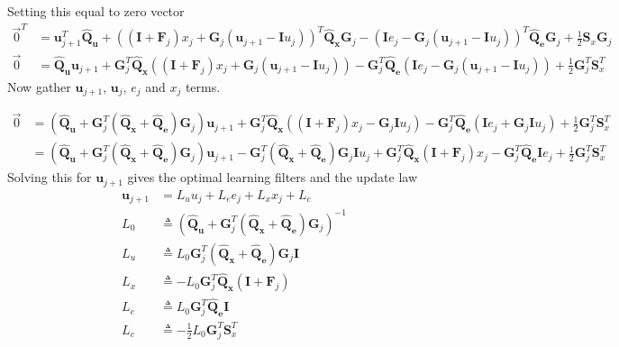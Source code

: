 \documentclass{article}
\begin{document}
Setting this equal to zero vector
\begin{align}
\vec{0}^T &
= \mathbf{u}_{j+1}^T \mathbf{\hat{Q}_u} 
+ \left( \left(\mathbf{I} +\mathbf{F}_j \right)x_j + \mathbf{G}_j \left(\mathbf{u}_{j+1} - \mathbf{I}u_j \right) \right)^T \mathbf{\hat{Q}_x}\mathbf{G}_j
- \left( \mathbf{I} e_j - \mathbf{G}_j \left(\mathbf{u}_{j+1} - \mathbf{I}u_j \right)\right)^T \mathbf{\hat{Q}_e} \mathbf{G}_j
+ \frac{1}{2}\mathbf{S}_x  \mathbf{G}_j\\
\vec{0} &
= \mathbf{\hat{Q}_u} \mathbf{u}_{j+1}
+ \mathbf{G}_j ^T \mathbf{\hat{Q}_x}\left( \left(\mathbf{I} +\mathbf{F}_j \right)x_j + \mathbf{G}_j \left(\mathbf{u}_{j+1} - \mathbf{I}u_j \right) \right)
- \mathbf{G}_j^T \mathbf{\hat{Q}_e} \left( \mathbf{I} e_j - \mathbf{G}_j \left(\mathbf{u}_{j+1} - \mathbf{I}u_j \right)\right)
+ \frac{1}{2}\mathbf{G}_j^T\mathbf{S}_x^T
\end{align}
Now gather $\mathbf{u}_{j+1}$, $\mathbf{u}_{j}$, $e_j$ and $x_j$ terms.

\begin{align}
\vec{0} &
= \left( \mathbf{\hat{Q}_u} + \mathbf{G}_j^T\left(\mathbf{\hat{Q}_x} + \mathbf{\hat{Q}_e} \right)\mathbf{G}_j  \right)\mathbf{u}_{j+1}
+ \mathbf{G}_j^T \mathbf{\hat{Q}_x} \left( \left(\mathbf{I} +\mathbf{F}_j \right)x_j - \mathbf{G}_j \mathbf{I}u_j \right)
- \mathbf{G}_j^T \mathbf{\hat{Q}_e} \left( \mathbf{I} e_j + \mathbf{G}_j \mathbf{I}u_j \right)
+ \frac{1}{2}\mathbf{G}_j^T\mathbf{S}_x^T\\
&
= \left( \mathbf{\hat{Q}_u} + \mathbf{G}_j^T\left(\mathbf{\hat{Q}_x} + \mathbf{\hat{Q}_e} \right)\mathbf{G}_j  \right)\mathbf{u}_{j+1}
- \mathbf{G}_j^T \left(\mathbf{\hat{Q}_x} + \mathbf{\hat{Q}_e}\right) \mathbf{G}_j \mathbf{I}u_j
+ \mathbf{G}_j^T \mathbf{\hat{Q}_x} \left(\mathbf{I} +\mathbf{F}_j \right)x_j
- \mathbf{G}_j^T \mathbf{\hat{Q}_e} \mathbf{I} e_j 
+ \frac{1}{2}\mathbf{G}_j^T\mathbf{S}_x^T
\end{align}
Solving this for $\mathbf{u}_{j+1}$ gives the optimal learning filters and the update law
\begin{align}
\mathbf{u}_{j+1} & = L_u u_j + L_e e_j + L_x x_j + L_c\\
L_0 & \triangleq \left( \mathbf{\hat{Q}_u} + \mathbf{G}_j^T\left(\mathbf{\hat{Q}_x} + \mathbf{\hat{Q}_e} \right)\mathbf{G}_j  \right)^{-1}\\
L_u & \triangleq L_0\mathbf{G}_j^T \left(\mathbf{\hat{Q}_x} + \mathbf{\hat{Q}_e}\right) \mathbf{G}_j \mathbf{I}\\
L_x & \triangleq -L_0\mathbf{G}_j^T \mathbf{\hat{Q}_x} \left(\mathbf{I} +\mathbf{F}_j \right)\\
L_e & \triangleq L_0 \mathbf{G}_j^T \mathbf{\hat{Q}_e} \mathbf{I}\\
L_c & \triangleq -\frac{1}{2}L_0\mathbf{G}_j^T\mathbf{S}_x^T
\end{align}
\end{document}
